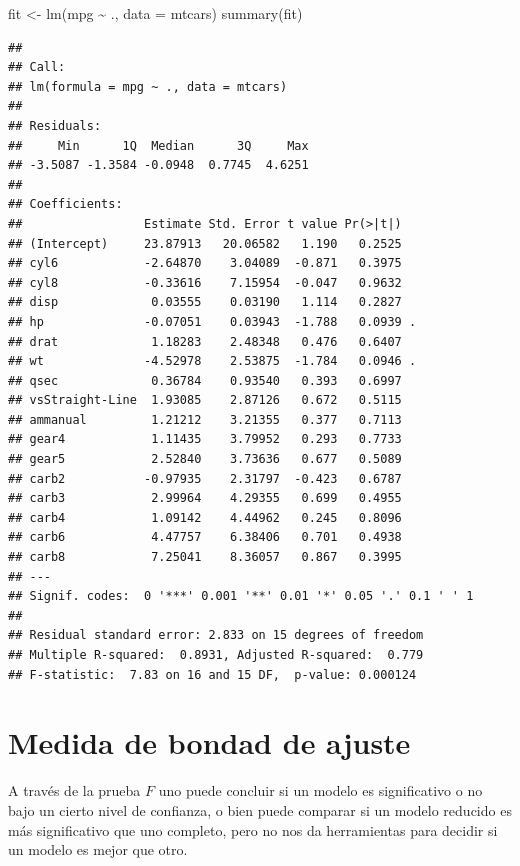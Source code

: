 \documentclass[
  12pt,
]{book}
\newenvironment{Shaded}{\begin{snugshade}}{\end{snugshade}}
\newcommand{\AttributeTok}[1]{\textcolor[rgb]{0.77,0.63,0.00}{#1}}
\newcommand{\FunctionTok}[1]{\textcolor[rgb]{0.00,0.00,0.00}{#1}}
\newcommand{\NormalTok}[1]{#1}
\newcommand{\OtherTok}[1]{\textcolor[rgb]{0.56,0.35,0.01}{#1}}
\newcommand{\SpecialCharTok}[1]{\textcolor[rgb]{0.00,0.00,0.00}{#1}}
\theoremstyle{definition}
\theoremstyle{definition}
\theoremstyle{definition}
\theoremstyle{definition}
\theoremstyle{remark}
\begin{document}
\begin{Shaded}
\begin{Highlighting}[]
\NormalTok{fit }\OtherTok{\textless{}{-}} \FunctionTok{lm}\NormalTok{(mpg }\SpecialCharTok{\textasciitilde{}}\NormalTok{ ., }\AttributeTok{data =}\NormalTok{ mtcars)}
\FunctionTok{summary}\NormalTok{(fit)}
\end{Highlighting}
\end{Shaded}

\begin{verbatim}
## 
## Call:
## lm(formula = mpg ~ ., data = mtcars)
## 
## Residuals:
##     Min      1Q  Median      3Q     Max 
## -3.5087 -1.3584 -0.0948  0.7745  4.6251 
## 
## Coefficients:
##                 Estimate Std. Error t value Pr(>|t|)  
## (Intercept)     23.87913   20.06582   1.190   0.2525  
## cyl6            -2.64870    3.04089  -0.871   0.3975  
## cyl8            -0.33616    7.15954  -0.047   0.9632  
## disp             0.03555    0.03190   1.114   0.2827  
## hp              -0.07051    0.03943  -1.788   0.0939 .
## drat             1.18283    2.48348   0.476   0.6407  
## wt              -4.52978    2.53875  -1.784   0.0946 .
## qsec             0.36784    0.93540   0.393   0.6997  
## vsStraight-Line  1.93085    2.87126   0.672   0.5115  
## ammanual         1.21212    3.21355   0.377   0.7113  
## gear4            1.11435    3.79952   0.293   0.7733  
## gear5            2.52840    3.73636   0.677   0.5089  
## carb2           -0.97935    2.31797  -0.423   0.6787  
## carb3            2.99964    4.29355   0.699   0.4955  
## carb4            1.09142    4.44962   0.245   0.8096  
## carb6            4.47757    6.38406   0.701   0.4938  
## carb8            7.25041    8.36057   0.867   0.3995  
## ---
## Signif. codes:  0 '***' 0.001 '**' 0.01 '*' 0.05 '.' 0.1 ' ' 1
## 
## Residual standard error: 2.833 on 15 degrees of freedom
## Multiple R-squared:  0.8931, Adjusted R-squared:  0.779 
## F-statistic:  7.83 on 16 and 15 DF,  p-value: 0.000124
\end{verbatim}

\hypertarget{medida-de-bondad-de-ajuste}{%
\section{Medida de bondad de ajuste}\label{medida-de-bondad-de-ajuste}}

A través de la prueba \(F\) uno puede concluir si un modelo es significativo o no bajo un cierto nivel de confianza, o bien puede comparar si un modelo reducido es más significativo que uno completo, pero no nos da herramientas para decidir si un modelo es mejor que otro.
\end{document}
